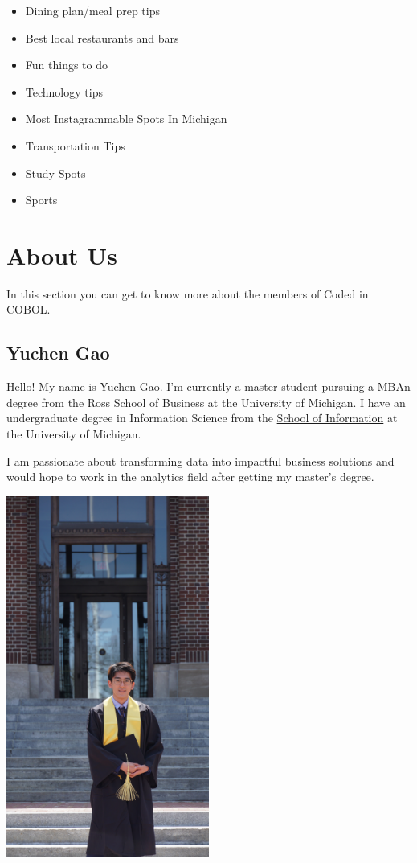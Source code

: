 \documentclass[
]{book}
\providecommand{\tightlist}{%
  \setlength{\itemsep}{0pt}\setlength{\parskip}{0pt}}
\begin{document}
\begin{itemize}
\tightlist
\item
  Dining plan/meal prep tips
\item
  Best local restaurants and bars
\item
  Fun things to do
\item
  Technology tips
\item
  Most Instagrammable Spots In Michigan
\item
  Transportation Tips
\item
  Study Spots
\item
  Sports
\end{itemize}

\hypertarget{about-us}{%
\chapter{About Us}\label{about-us}}

In this section you can get to know more about the members of Coded in COBOL.

\hypertarget{yuchen-gao}{%
\section{Yuchen Gao}\label{yuchen-gao}}

Hello! My name is Yuchen Gao. I'm currently a master student pursuing a \href{https://michiganross.umich.edu/graduate/master-of-business-analytics}{MBAn} degree from the Ross School of Business at the University of Michigan. I have an undergraduate degree in Information Science from the \href{https://www.si.umich.edu/}{School of Information} at the University of Michigan.

I am passionate about transforming data into impactful business solutions and would hope to work in the analytics field after getting my master's degree.

\includegraphics[width=0.5\textwidth,height=\textheight]{DSC00610.JPG}
\end{document}
